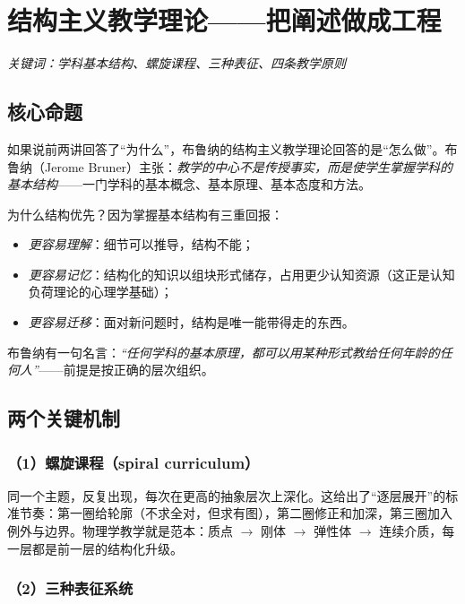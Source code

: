 \section{结构主义教学理论——把阐述做成工程}

\noindent\textit{关键词：学科基本结构、螺旋课程、三种表征、四条教学原则}

\subsection{核心命题}

如果说前两讲回答了“为什么”，布鲁纳的结构主义教学理论回答的是“怎么做”。布鲁纳（Jerome Bruner）主张：\textit{教学的中心不是传授事实，而是使学生掌握学科的基本结构}——一门学科的基本概念、基本原理、基本态度和方法。

为什么结构优先？因为掌握基本结构有三重回报：
\begin{itemize}
    \item \textit{更容易理解}：细节可以推导，结构不能；
    \item \textit{更容易记忆}：结构化的知识以组块形式储存，占用更少认知资源（这正是认知负荷理论的心理学基础）；
    \item \textit{更容易迁移}：面对新问题时，结构是唯一能带得走的东西。
\end{itemize}

布鲁纳有一句名言：\textit{“任何学科的基本原理，都可以用某种形式教给任何年龄的任何人”}——前提是按正确的层次组织。

\subsection{两个关键机制}

\subsubsection{（1）螺旋课程（spiral curriculum）}

同一个主题，反复出现，每次在更高的抽象层次上深化。这给出了“逐层展开”的标准节奏：第一圈给轮廓（不求全对，但求有图），第二圈修正和加深，第三圈加入例外与边界。物理学教学就是范本：质点 $\to$ 刚体 $\to$ 弹性体 $\to$ 连续介质，每一层都是前一层的结构化升级。

\subsubsection{（2）三种表征系统}

